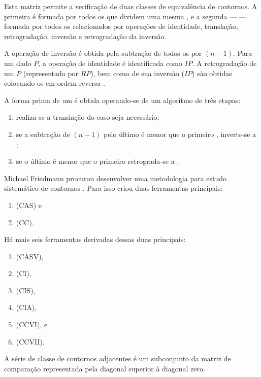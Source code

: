 Esta matriz permite a verificação de duas classes de equivalência de
contornos. A primeira é formada por todos os  que dividem
uma mesma , e a segunda ---
 --- formada por todos os  relacionados
por operações de identidade, translação, retrogradação, inversão e
retrogradação da inversão.

A operação de inversão é obtida pela subtração de todos os
 por $(n-1)$. Para um dado  $P$, a
operação de identidade é identificada como $IP$. A retrogradação de um
 $P$ (representado por $RP$), bem como de sua inversão
($IP$) são obtidas colocando os  em ordem reversa
\cite[p. 231]{marvin.ea87:relating}.

A forma prima de um  é obtida operando-se de um
algoritmo de três etapas:
\begin{enumerate}
\item realiza-se a translação do  caso seja necessário;
\item se a subtração de $(n-1)$ pelo último  é menor
  que o primeiro , inverte-se a ;
\item se o último  é menor que o primeiro
   retrograda-se a .
\end{enumerate}

Michael Friedmann procurou desenvolver uma metodologia para estudo
sistemático de contornos \cite{friedmann85:methodology}. Para isso
criou duas ferramentas principais:

\begin{enumerate}
\item {} (CAS) e
\item {} (CC).
\end{enumerate}

Há mais seis ferramentas derivadas dessas duas principais:

\begin{enumerate}
\item {} (CASV),
\item {} (CI),
\item {} (CIS),
\item {} (CIA),
\item {} (CCVI), e
\item {} (CCVII).
\end{enumerate}

A série de classe de contornos adjacentes é um subconjunto da matriz
de comparação representada pela diagonal superior à diagonal zero.

